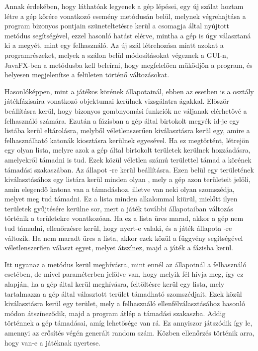 Annak érdekében, hogy láthatóak legyenek a gép lépései, egy új szálat hoztam létre a gép körére vonatkozó esemény metódusán belül, melynek végrehajtása a program bizonyos pontjain szüneteltetésre kerül a  csomagja által nyújtott  metódus segítségével, ezzel hasonló hatást elérve, mintha a gép is úgy választaná ki a megyét, mint egy felhasználó.
Az új szál létrehozása miatt azokat a programrészeket, melyek a szálon belül módosításokat végeznek a GUI-n, JavaFX-ben a  metódusba kell beleírni, hogy megfelelően működjön a program, és helyesen megjelenítse a felületen történő változásokat. 

Hasonlóképpen, mint a játékos körének állapotainál, ebben az esetben is a  osztály játékfázisaira vonatkozó  objektumai kerülnek vizsgálatra  ágakkal.
Először beállításra kerül, hogy bizonyos gombnyomási funkciók ne váljanak elérhetővé a felhasználó számára.
Ezután a  fázisban a gép által birtokolt megyék id-je egy listába kerül eltárolásra, melyből véletlenszerűen kiválasztásra kerül egy, amire a felhasználható katonák kiosztásra kerülnek egyesével.
Ha ez megtörtént, létrejön egy olyan lista, melyre azok a gép által birtokolt területek kerülnek hozzáadásra, amelyekről támadni is tud.
Ezek közül véletlen számú területtel támad a körének támadási szakaszában. Az állapot -re kerül beállításra.
Ezen belül egy területének kiválasztásához egy listára kerül minden olyan , mely a gép azon területeit jelöli, amin elegendő katona van a támadáshoz, illetve van neki olyan szomszédja, melyet meg tud támadni.
Ez a lista minden alkalommal kiürül, mielőtt ilyen területek gyűjtésére kerülne sor, mert a játék további állapotaiban változás történik a területekre vonatkozóan.
Ha ez a lista üres marad, akkor a gép nem tud támadni, ellenőrzésre kerül, hogy nyert-e valaki, és a játék állapota -re változik. Ha nem maradt üres a lista, akkor ezek közül a  függvény segítségével véletlenszerűen választ egyet, melyet átszínez, majd a játék a  fázisba kerül. 

Itt ugyanaz a metódus kerül meghívásra, mint ennél az állapotnál a felhasználó esetében, de mivel paraméterben jelölve van, hogy melyik fél hívja meg, így ez alapján, ha a gép által kerül meghívásra, feltöltésre kerül egy lista, mely tartalmazza a gép által választott terület támadható szomszédjait.
Ezek közül kiválasztásra kerül egy terület, mely a felhasználó ellenfélválasztásához hasonló módon átszíneződik, majd a program átlép a támadási szakaszba.
Addig történnek a gép támadásai, amíg lehetősége van rá.
Ez annyiszor játszódik így le, amennyi az erősítés végén generált random szám.
Közben ellenőrzés történik arra, hogy van-e a játéknak nyertese. 

